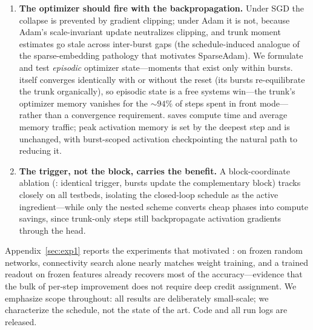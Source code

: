\begin{enumerate}
  interleaving at a $20\%$ budget trains to a worse loss than spending
  nothing on depth at all. Consecutive phases (\fw{} bursts, \lpft{}'s single
  switch) do not exhibit the failure.
  \item \textbf{The optimizer should fire with the backpropagation.} Under
  SGD the collapse is prevented by gradient clipping; under Adam it is not,
  because Adam's scale-invariant update neutralizes clipping, and trunk
  moment estimates go stale across inter-burst gaps (the schedule-induced
  analogue of the sparse-embedding pathology that motivates SparseAdam). We
  formulate and test \emph{episodic} optimizer state---moments that exist
  only within bursts. \fw{} itself converges identically with or without
  the reset (its bursts re-equilibrate the trunk organically), so episodic
  state is a free systems win---the trunk's optimizer memory vanishes for
  the ${\sim}94\%$ of steps spent in front mode---rather than a
  convergence requirement. \fw{} saves compute time and average memory
  traffic; peak activation memory is set by the deepest step and is
  unchanged, with burst-scoped activation checkpointing the natural path to
  reducing it.
  \item \textbf{The trigger, not the block, carries the benefit.} A
  block-coordinate ablation (\bcd{}: identical trigger, bursts update the
  complementary block) tracks \fw{} closely on all testbeds, isolating the
  closed-loop schedule as the active ingredient---while only the nested
  scheme converts cheap phases into compute savings, since trunk-only steps
  still backpropagate activation gradients through the head.
\end{enumerate}

Appendix~\ref{sec:exp1} reports the experiments that motivated \fw{}: on
frozen random networks, connectivity search alone nearly matches weight
training, and a trained readout on frozen features already recovers most of
the accuracy---evidence that the bulk of per-step improvement does not
require deep credit assignment. We emphasize scope throughout: all results
are deliberately small-scale; we characterize the schedule, not the state of
the art. Code and all run logs are released.
